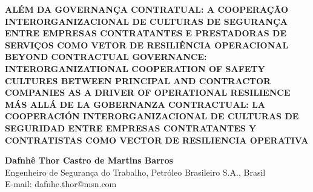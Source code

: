 \documentclass[12pt,a4paper]{article}
\begin{document}
\begin{center}
  {\fontsize{14}{16}\selectfont \textbf{ALÉM DA GOVERNANÇA CONTRATUAL: A COOPERAÇÃO INTERORGANIZACIONAL DE CULTURAS DE SEGURANÇA ENTRE EMPRESAS CONTRATANTES E PRESTADORAS DE SERVIÇOS COMO VETOR DE RESILIÊNCIA OPERACIONAL}}\\[0.4cm]
  {\fontsize{12}{14}\selectfont \textbf{BEYOND CONTRACTUAL GOVERNANCE: INTERORGANIZATIONAL COOPERATION OF SAFETY CULTURES BETWEEN PRINCIPAL AND CONTRACTOR COMPANIES AS A DRIVER OF OPERATIONAL RESILIENCE}}\\[0.4cm]
  {\fontsize{12}{14}\selectfont \textbf{MÁS ALLÁ DE LA GOBERNANZA CONTRACTUAL: LA COOPERACIÓN INTERORGANIZACIONAL DE CULTURAS DE SEGURIDAD ENTRE EMPRESAS CONTRATANTES Y CONTRATISTAS COMO VECTOR DE RESILIENCIA OPERATIVA}}
\end{center}

\vspace{0.4cm}

\begin{flushright}
  \fontsize{10}{12}\selectfont
  \textbf{Dafnhê Thor Castro de Martins Barros}\\
  Engenheiro de Segurança do Trabalho, Petróleo Brasileiro S.A., Brasil\\
  E-mail: dafnhe.thor@msn.com
\end{flushright}

\vspace{0.3cm}
\end{document}
